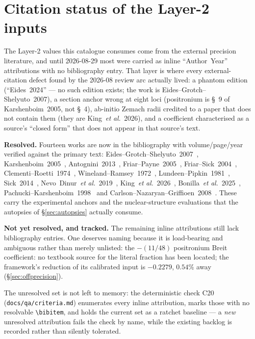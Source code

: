 \documentclass[11pt]{article}
\begin{document}
\section*{Citation status of the Layer-2 inputs}
\label{sec:citation_status}

The Layer-2 values this catalogue consumes come from the external precision
literature, and until 2026-08-29 most were carried as inline
``Author~Year'' attributions with no bibliography entry.  That layer is
where every external-citation defect found by the 2026-08 review arc
actually lived: a phantom edition (``Eides~2024'' --- no such edition
exists; the work is Eides--Grotch--Shelyuto~2007), a section anchor wrong
at eight loci (positronium is \S~9 of Karshenboim~2005, not \S~4), ab-initio
Zemach radii credited to a paper that does not contain them (they are
King~\emph{et al.}~2026), and a coefficient characterised as a source's
``closed form'' that does not appear in that source's text.

\textbf{Resolved.}  Fourteen works are now in the bibliography with
volume/page/year verified against the primary text:
Eides--Grotch--Shelyuto~2007~\cite{eides_grotch_shelyuto2007},
Karshenboim~2005~\cite{karshenboim2005},
Antognini~2013~\cite{antognini2013},
Friar--Payne~2005~\cite{friar_payne2005},
Friar--Sick~2004~\cite{friar_sick2004},
Clementi--Roetti~1974~\cite{clementi_roetti1974},
Wineland--Ramsey~1972~\cite{wineland_ramsey1972},
Lundeen--Pipkin~1981~\cite{lundeen_pipkin1981},
Sick~2014~\cite{sick2014},
Nevo~Dinur~\emph{et al.}~2019~\cite{nevo_dinur2019},
King~\emph{et al.}~2026~\cite{king2026},
Bonilla~\emph{et al.}~2025~\cite{bonilla2025},
Pachucki--Karshenboim~1998~\cite{pachucki_karshenboim1998} and
Carlson--Nazaryan--Griffioen~2008~\cite{carlson_nazaryan_griffioen2008}.
These carry the experimental anchors and the nuclear-structure evaluations
that the autopsies of \S\ref{sec:autopsies} actually consume.

\textbf{Not yet resolved, and tracked.}  The remaining inline attributions
still lack bibliography entries.  One deserves naming because it is
load-bearing and ambiguous rather than merely unlisted: the
$-(11/48)$ positronium Breit coefficient: no textbook source for the
literal fraction has been located; the framework's reduction of its
calibrated input is $-0.2279$, $0.54\%$ away (\S\ref{sec:offprecision}).

The unresolved set is not left to memory: the deterministic check C20 (\texttt{docs/qa/criteria.md}) enumerates every inline
attribution, marks those with no resolvable \verb|\bibitem|, and holds the
current set as a ratchet baseline --- a \emph{new} unresolved attribution
fails the check by name, while the existing backlog is recorded rather
than silently tolerated.
\end{document}
